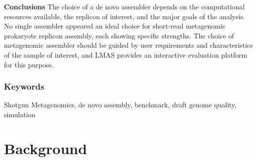 \textbf{Conclusions} The choice of a de novo assembler depends on the computational resources available, the replicon of interest, and the major goals of the analysis. No single assembler appeared an ideal choice for short-read metagenomic prokaryote replicon assembly, each showing specific strengths. The choice of metagenomic assembler should be guided by user requirements and characteristics of the sample of interest, and LMAS provides an interactive evaluation platform for this purpose. 

\subsubsection{Keywords}

Shotgun Metagenomics, de novo assembly, benchmark, draft genome quality, simulation

\section{Background}

